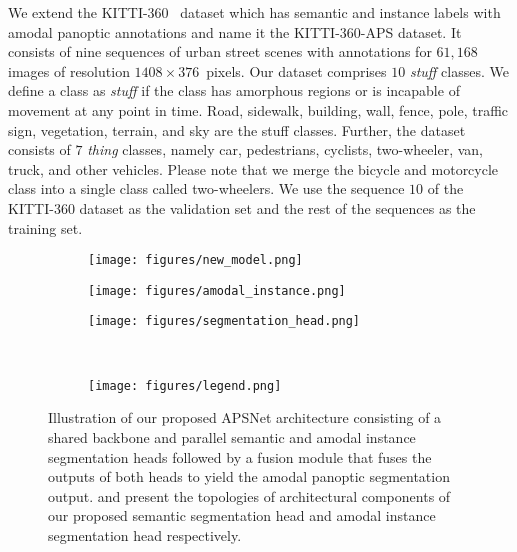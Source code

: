 \documentclass[10pt,twocolumn,letterpaper]{article}
\begin{document}
We extend the KITTI-360~\cite{Liao2021ARXIV} dataset which has semantic and instance labels with amodal panoptic annotations and name it the KITTI-360-APS dataset. It consists of nine sequences of urban street scenes with annotations for $61{,}168$ images of resolution $1408\times376$~pixels. Our dataset comprises $10$ \textit{stuff} classes. We define a class as \textit{stuff} if the class has amorphous regions or is incapable of movement at any point in time. Road, sidewalk, building, wall, fence, pole, traffic sign, vegetation, terrain, and sky are the stuff classes. Further, the dataset consists of $7$ \textit{thing} classes, namely car, pedestrians, cyclists, two-wheeler, van, truck, and other vehicles. Please note that we merge the bicycle and motorcycle class into a single class called two-wheelers. We use the sequence $10$ of the KITTI-360 dataset as the validation set and the rest of the sequences as the training set.

\begin{figure*}
    \centering
    \begin{subfigure}[b]{0.30\linewidth}
        \centering
        \texttt{[image: figures/new\_model.png]}
        \label{APSNEt_arch}
    \end{subfigure}
        \hfill
    \begin{subfigure}[b]{0.4\linewidth}
        \centering
        \texttt{[image: figures/amodal\_instance.png]}
        \label{amodal_segmentation_head1}
    \end{subfigure}
    \hfill
    \begin{subfigure}[b]{0.25\linewidth}
        \centering
        \texttt{[image: figures/segmentation\_head.png]}
        \label{semantic_segmentation_head}
    \end{subfigure}
    \\
    \vspace{0.2cm}
    \begin{subfigure}[b]{0.7\linewidth}
        \centering
        \texttt{[image: figures/legend.png]}
        \label{panoptic_segmentation_eg1}
    \end{subfigure}
\vspace{-0.5cm}
\caption{ Illustration of our proposed \mbox{APSNet} architecture consisting of a shared backbone and parallel semantic and amodal instance segmentation heads followed by a fusion module that fuses the outputs of both heads to yield the amodal panoptic segmentation output.  and  present the topologies of architectural components of our proposed semantic segmentation head and amodal instance segmentation head respectively.}
    \label{fig:network}
    \vspace{-0.3cm}
\end{figure*}
\end{document}
